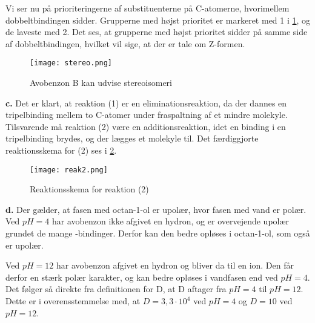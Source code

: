 \documentclass{report}
\begin{document}
Vi ser nu på prioriteringerne af substituenterne på C-atomerne, hvorimellem dobbeltbindingen sidder.
Grupperne med højst prioritet er markeret med 1 i \cref{fig:stereo}, og de laveste med 2.
Det ses, at grupperne med højst prioritet sidder på samme side af dobbeltbindingen, hvilket vil sige, at der er tale om Z-formen.

\begin{figure}[H]
\begin{center}
  \texttt{[image: stereo.png]}
\end{center}
\caption{Avobenzon B kan udvise stereoisomeri}
\label{fig:stereo}
\end{figure}
\noindent \textbf{c.}
Det er klart, at reaktion (1) er en eliminationsreaktion, da der dannes en tripelbinding mellem to C-atomer under fraspaltning af et mindre molekyle.
Tilsvarende må reaktion (2) være en additionsreaktion, idet en binding i en tripelbinding brydes, og der lægges et molekyle til.
Det færdiggjorte reaktionsskema for (2) ses i \cref{fig:reak2}.
\begin{figure}[H]
\begin{center}
  \texttt{[image: reak2.png]}
\end{center}
  \caption{Reaktionsskema for reaktion (2)}
\label{fig:reak2}
\end{figure}
\noindent \textbf{d.}
Der gælder, at fasen med octan-1-ol er upolær, hvor fasen med vand er polær.
Ved $pH=4$ har avobenzon ikke afgivet en hydron, og er overvejende upolær grundet de mange -bindinger.
Derfor kan den bedre opløses i octan-1-ol, som også er upolær.

Ved $pH=12$ har avobenzon afgivet en hydron og bliver da til en ion. 
Den får derfor en stærk polær karakter, og kan bedre opløses i vandfasen end ved $pH=4$.
Det følger så direkte fra definitionen for D, at D aftager fra $pH=4$ til $pH=12$. 
Dette er i overensstemmelse med, at $D=3,3 \cdot 10^4$ ved $pH=4$ og $D=10$ ved $pH=12$. 
\end{document}
